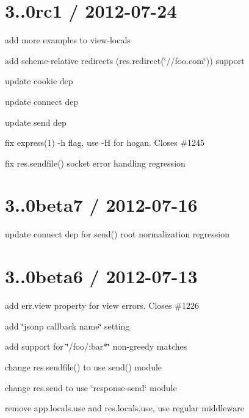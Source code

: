 {\ttfamily \section*{3..\+0rc1 / 2012-\/07-\/24 }}

{\ttfamily }

{\ttfamily 
\begin{DoxyItemize}
\item add more examples to view-\/locals
\item add scheme-\/relative redirects ({\ttfamily res.\+redirect(\char`\"{}//foo.\+com\char`\"{})}) support
\item update cookie dep
\item update connect dep
\item update send dep
\item fix {\ttfamily express(1)} -\/h flag, use -\/H for hogan. Closes \#1245
\item fix {\ttfamily res.\+sendfile()} socket error handling regression
\end{DoxyItemize}}

{\ttfamily \section*{3..\+0beta7 / 2012-\/07-\/16 }}

{\ttfamily }

{\ttfamily 
\begin{DoxyItemize}
\item update connect dep for {\ttfamily send()} root normalization regression
\end{DoxyItemize}}

{\ttfamily \section*{3..\+0beta6 / 2012-\/07-\/13 }}

{\ttfamily }

{\ttfamily 
\begin{DoxyItemize}
\item add {\ttfamily err.\+view} property for view errors. Closes \#1226
\item add \char`\"{}jsonp callback name\char`\"{} setting
\item add support for \char`\"{}/foo/\+:bar$\ast$\char`\"{} non-\/greedy matches
\item change {\ttfamily res.\+sendfile()} to use {\ttfamily send()} module
\item change {\ttfamily res.\+send} to use \char`\"{}response-\/send\char`\"{} module
\item remove {\ttfamily app.\+locals.\+use} and {\ttfamily res.\+locals.\+use}, use regular middleware
\end{DoxyItemize}}

